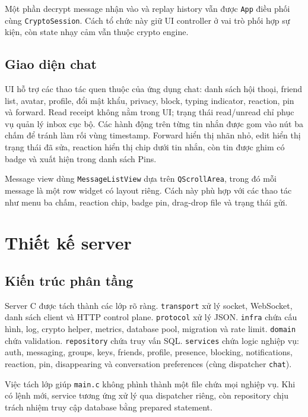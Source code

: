 Một phần decrypt message nhận vào và replay history vẫn được \texttt{App} điều phối cùng \texttt{CryptoSession}. Cách tổ chức này giữ UI controller ở vai trò phối hợp sự kiện, còn state nhạy cảm vẫn thuộc crypto engine.

\subsection{Giao diện chat}

UI hỗ trợ các thao tác quen thuộc của ứng dụng chat: danh sách hội thoại, friend list, avatar, profile, đổi mật khẩu, privacy, block, typing indicator, reaction, pin và forward. Read receipt không nằm trong UI; trạng thái read/unread chỉ phục vụ quản lý inbox cục bộ. Các hành động trên từng tin nhắn được gom vào nút ba chấm để tránh làm rối vùng timestamp. Forward hiển thị nhãn nhỏ, edit hiển thị trạng thái đã sửa, reaction hiển thị chip dưới tin nhắn, còn tin được ghim có badge và xuất hiện trong danh sách Pins.

Message view dùng \texttt{MessageListView} dựa trên \texttt{QScrollArea}, trong đó mỗi message là một row widget có layout riêng. Cách này phù hợp với các thao tác như menu ba chấm, reaction chip, badge pin, drag-drop file và trạng thái gửi.

\section{Thiết kế server}

\subsection{Kiến trúc phân tầng}

Server C được tách thành các lớp rõ ràng. \texttt{transport} xử lý socket, WebSocket, danh sách client và HTTP control plane. \texttt{protocol} xử lý JSON. \texttt{infra} chứa cấu hình, log, crypto helper, metrics, database pool, migration và rate limit. \texttt{domain} chứa validation. \texttt{repository} chứa truy vấn SQL. \texttt{services} chứa logic nghiệp vụ: auth, messaging, groups, keys, friends, profile, presence, blocking, notifications, reaction, pin, disappearing và conversation preferences (cùng dispatcher \texttt{chat}).

Việc tách lớp giúp \texttt{main.c} không phình thành một file chứa mọi nghiệp vụ. Khi có lệnh mới, service tương ứng xử lý qua dispatcher riêng, còn repository chịu trách nhiệm truy cập database bằng prepared statement.

